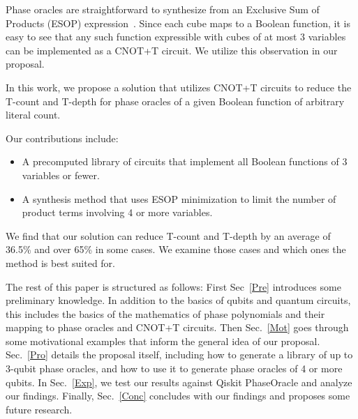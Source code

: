 Phase oracles are straightforward to synthesize from an Exclusive Sum
of Products (ESOP) expression~\cite{bib-phaseoracle}. Since each cube maps to
a Boolean function, it is easy to see that any such function expressible with
cubes of at most 3 variables can be implemented as a CNOT+T circuit. We utilize
this observation in our proposal.

In this work, we propose a solution that utilizes CNOT+T circuits to reduce the
T-count and T-depth for phase oracles of a given Boolean function of arbitrary
literal count.

Our contributions include:

\begin{itemize}
\item A precomputed library of circuits that implement all Boolean functions of
  3 variables or fewer.
\item A synthesis method that uses ESOP minimization to limit the number of
  product terms involving 4 or more variables.
\end{itemize}

We find that our solution can reduce T-count and T-depth by an average of 36.5\%
and over 65\% in some cases. We examine those cases and which ones the method
is best suited for.

The rest of this paper is structured as follows: First Sec~\ref{Pre}
introduces some preliminary knowledge. In addition to the basics of
qubits and quantum circuits, this includes the basics of the
mathematics of phase polynomials and their mapping to phase oracles
and CNOT+T circuits. Then Sec.~\ref{Mot} goes through some
motivational examples that inform the general idea of our proposal.
Sec.~\ref{Pro} details the proposal itself, including how to
generate a library of up to 3-qubit phase oracles, and how to use
it to generate phase oracles of 4 or more qubits. In Sec.~\ref{Exp},
we test our results against Qiskit PhaseOracle and analyze our
findings. Finally, Sec.~\ref{Conc} concludes with our findings and
proposes some future research.

